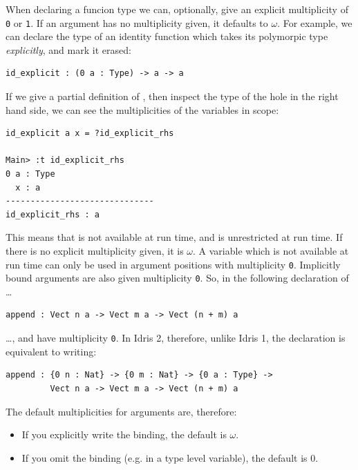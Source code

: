 When declaring a funcion type we can, optionally, give an explicit multiplicity
of \texttt{0} or \texttt{1}. If an argument has no multiplicity
given, it defaults to $\omega$.  For example, we can declare the type of
an identity function which takes its polymorpic type \emph{explicitly}, and
mark it erased:

\begin{lstlisting}
id_explicit : (0 a : Type) -> a -> a 
\end{lstlisting}

If we give a partial definition of , then inspect the type of
the hole in the right hand side, we can see the multiplicities of the variables
in scope:

\begin{lstlisting}
id_explicit a x = ?id_explicit_rhs

Main> :t id_explicit_rhs
0 a : Type
  x : a
------------------------------
id_explicit_rhs : a
\end{lstlisting}

This means that  is not available at run time, and  is unrestricted
at run time. If there is no explicit multiplicity given, it is $\omega$. A
variable which is not available at run time can only be used in
argument positions with multiplicity \texttt{0}.
%
Implicitly bound arguments are also given
multiplicity \texttt{0}. So, in the following declaration of \ldots

\begin{lstlisting}
append : Vect n a -> Vect m a -> Vect (n + m) a
\end{lstlisting}

\ldots {},  and  have multiplicity \texttt{0}. In Idris 2,
therefore, unlike Idris 1, the declaration is equivalent to writing:

\begin{lstlisting}
append : {0 n : Nat} -> {0 m : Nat} -> {0 a : Type} ->
         Vect n a -> Vect m a -> Vect (n + m) a
\end{lstlisting}

The default multiplicities for arguments are, therefore:

\begin{itemize}
\item If you explicitly write the binding, the default is $\omega$.
\item If you omit the binding (e.g. in a type level variable), the default is $0$.
\end{itemize}

